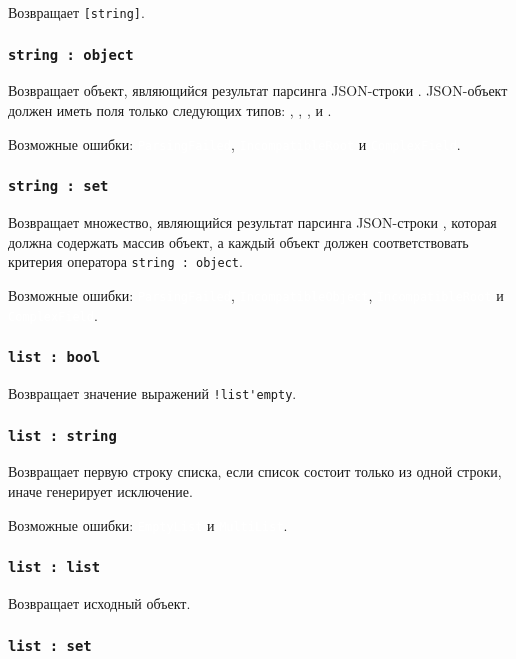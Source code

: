\documentclass[a4paper, 14pt]{extarticle}
\newcommand{\ferror}[1]{{\fontsize{11pt}{12pt} \tt \colorbox{function}{\textcolor{white}{#1}}}}
\begin{document}
Возвращает \lstinline|[string]|.

\subsubsection{\lstinline|string : object|}

Возвращает объект, являющийся результат парсинга JSON-строки \str. JSON-объект должен иметь поля только следующих типов: \bool, \integer, \double, \str{} и \listtype.

Возможные ошибки: \ferror{ParsingFailed}, \ferror{IncompatibleRoot} и \ferror{ComplexField}.

\subsubsection{\lstinline|string : set|}

Возвращает множество, являющийся результат парсинга JSON-строки \str, которая должна содержать массив объект, а каждый объект должен соответствовать критерия оператора \lstinline|string : object|.

Возможные ошибки: \ferror{ParsingFailed}, \ferror{IncompatibleObject}, \ferror{IncompatibleRoot} и \ferror{ComplexField}.

\subsubsection{\lstinline|list : bool|}

Возвращает значение выражений \lstinline|!list'empty|.

\subsubsection{\lstinline|list : string|}

Возвращает первую строку списка, если список состоит только из одной строки, иначе генерирует исключение.

Возможные ошибки: \ferror{EmptyList} и \ferror{MultiList}.

\subsubsection{\lstinline|list : list|}

Возвращает исходный объект.

\subsubsection{\lstinline|list : set|}
\end{document}
